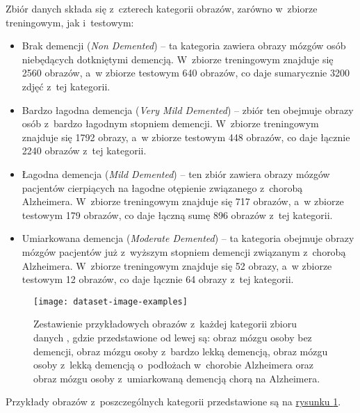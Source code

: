 Zbiór danych składa się z~czterech kategorii obrazów, zarówno w~zbiorze treningowym, jak i~testowym:

\begin{itemize}

  \item
        Brak demencji (\emph{Non Demented}) -- ta kategoria zawiera obrazy mózgów osób niebędących dotkniętymi demencją.
        W~zbiorze treningowym znajduje się 2560 obrazów, a~w zbiorze testowym 640 obrazów, co daje sumarycznie 3200 zdjęć z~tej kategorii.

  \item
        Bardzo łagodna demencja (\emph{Very Mild Demented}) -- zbiór ten obejmuje obrazy osób z~bardzo łagodnym stopniem demencji.
        W~zbiorze treningowym znajduje się 1792 obrazy, a~w zbiorze testowym 448 obrazów, co daje łącznie 2240 obrazów z~tej kategorii.

  \item
        Łagodna demencja (\emph{Mild Demented}) -- ten zbiór zawiera obrazy mózgów pacjentów cierpiących na łagodne otępienie związanego z~chorobą Alzheimera.
        W~zbiorze treningowym znajduje się 717 obrazów, a~w zbiorze testowym 179 obrazów, co daje łączną sumę 896 obrazów z~tej kategorii.

  \item
        Umiarkowana demencja (\emph{Moderate Demented}) -- ta kategoria obejmuje obrazy mózgów pacjentów już z~wyższym stopniem demencji związanym z~chorobą Alzheimera.
        W~zbiorze treningowym znajduje się 52 obrazy, a~w zbiorze testowym 12 obrazów, co daje łącznie 64 obrazy z~tej kategorii.

\end{itemize}

\begin{figure}[ht]
  \texttt{[image: dataset-image-examples]}
  \caption[Zestawienie przykładowych obrazów z~każdej kategorii zbioru danych]{Zestawienie przykładowych obrazów z~każdej kategorii zbioru danych \cite{kaggle-alzheimers-dataset}, gdzie przedstawione od lewej są: obraz mózgu osoby bez demencji, obraz mózgu osoby z~bardzo lekką demencją, obraz mózgu osoby z~lekką demencją o~podłożach w~chorobie Alzheimera oraz obraz mózgu osoby z~umiarkowaną demencją chorą na Alzheimera.}
  \label{fig:dataset-image-examples}
\end{figure}

Przykłady obrazów z~poszczególnych kategorii przedstawione są na \hyperref[fig:dataset-image-examples]{rysunku \ref*{fig:dataset-image-examples}}.

